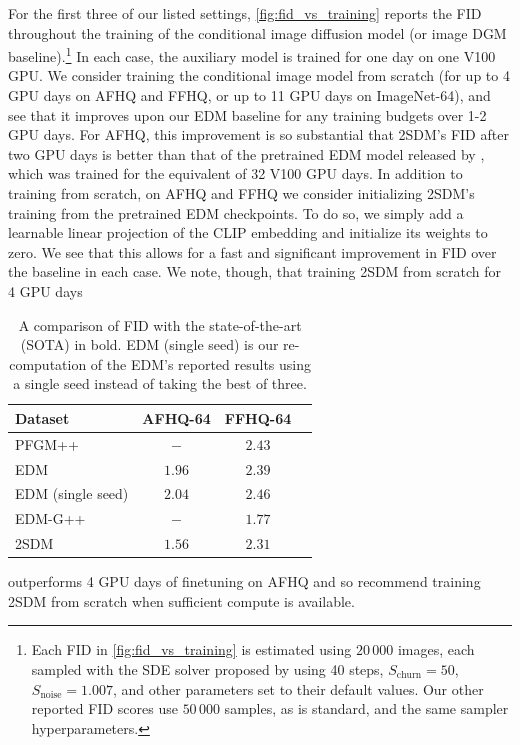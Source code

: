 For the first three of our listed settings, \cref{fig:fid_vs_training} reports the FID throughout the training of the conditional image diffusion model (or image DGM baseline).\footnote{Each FID in \cref{fig:fid_vs_training} is estimated using $20\,000$ images, each sampled with the SDE solver proposed by \citet{karras2022elucidating} using 40 steps, $S_\text{churn}=50$, $S_\text{noise}=1.007$, and other parameters set to their default values. Our other reported FID scores use $50\,000$ samples, as is standard, and the same sampler hyperparameters.}  In each case, the auxiliary model is trained for one day on one V100 GPU. We consider training the conditional image model from scratch (for up to 4 GPU days on AFHQ and FFHQ, or up to 11 GPU days on ImageNet-64), and see that it improves upon our EDM baseline for any training budgets over 1-2 GPU days. For AFHQ, this improvement is so substantial that 2SDM's FID after two GPU days is better than that of the pretrained EDM model released by \citet{karras2022elucidating}, which was trained for the equivalent of 32 V100 GPU days. In addition to training from scratch, on AFHQ and FFHQ we consider initializing 2SDM's training from the pretrained EDM checkpoints. To do so, we simply add a learnable linear projection of the CLIP embedding and initialize its weights to zero. We see that this allows for a fast and significant improvement in FID over the baseline in each case. We note, though, that training 2SDM from scratch for 4 GPU days 
\begin{table}
\centering
\caption{A comparison of FID with the state-of-the-art (SOTA) in bold. EDM (single seed) is our re-computation of the EDM's reported results using a single seed instead of taking the best of three.}
\label{tab:2sdm-sota}
\begin{tabular}{lccc}
\midrule
Dataset         & AFHQ-64 & FFHQ-64 \\
\midrule
PFGM++~\citep{xu2023pfgm++}          & $-$ & $2.43$ \\
EDM~\citep{karras2022elucidating}
& $1.96$ & $2.39$  \\
EDM (single seed)     & $2.04$ & $2.46$  \\
EDM-G++~\citep{kim2022refining}               & $-$    & $\mathbf{1.77}$  \\
2SDM            & $\mathbf{1.56}$ & $2.31$ \\
\end{tabular}
\end{table}
outperforms 4 GPU days of finetuning on AFHQ and so recommend training 2SDM from scratch when sufficient compute is available.

